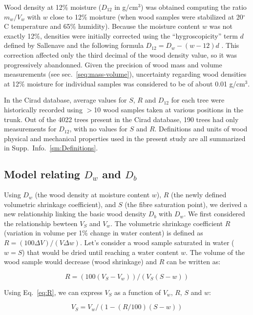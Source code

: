 \documentclass[a4paper, 12pt, leqno, dvipsnames]{article}\usepackage[]{graphicx}\usepackage[]{color}
\begin{document}
Wood density at 12\% moisture ($D_{12}$ in g/cm$^3$) was obtained computing the ratio $m_w/V_w$ with $w$ close to 12\% moisture (when wood samples were stabilized at 20$^\circ$C temperature and 65\% humidity). Because the moisture content $w$ was not exactly 12\%, densities were initially corrected using the ``hygroscopicity'' term $d$ defined by Sallenave and the following formula $D_{12}=D_w-(w-12)d$ \citep{Sallenave1971}. This correction affected only the third decimal of the wood density value, so it was progressively abandonned. Given the precision of wood mass and volume measurements (see sec.~\ref{seq:mass-volume}), uncertainty regarding wood densities at 12\% moisture for individual samples was considered to be of about 0.01 g/cm$^3$.

In the Cirad database, average values for $S$, $R$ and $D_{12}$ for each tree were historically recorded using $>$10 wood samples taken at various positions in the trunk. Out of the 4022 trees present in the Cirad database, 190 trees had only measurements for $D_{12}$, with no values for $S$ and $R$. Definitions and units of wood physical and mechanical properties used in the present study are all summarized in Supp.~Info.~\ref{sm:Definitions}.

\subsection{Model relating $D_{w}$ and $D_b$}

Using $D_{w}$ (the wood density at moisture content $w$), $R$ (the newly defined volumetric shrinkage coefficient), and $S$ (the fibre saturation point), we derived a new relationship linking the basic wood density $D_b$ with $D_w$. We first considered the relationship bewteen $V_S$ and $V_w$. The volumetric shrinkage coefficient $R$ (variation in volume per 1\% change in water content) is defined as $R=(100 \Delta V) / (V \Delta w)$. Let's consider a wood sample saturated in water ($w=S$) that would be dried until reaching a water content $w$. The volume of the wood sample would decrease (wood shrinkage) and $R$ can be written as: 

\begin{equation}
  R=(100(V_S-V_w))/(V_S(S-w))
  \label{eq:R}
\end{equation}

Using Eq.~\ref{eq:R}, we can express $V_S$ as a function of $V_w$, $R$, $S$ and $w$:

\begin{equation}
  V_S=V_w/(1-(R/100)(S-w))
  \label{eq:V_S}
\end{equation}
\end{document}

